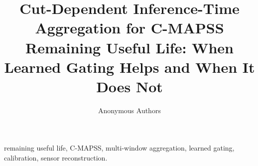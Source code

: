 \documentclass[journal]{IEEEtran}
\begin{document}
\title{Cut-Dependent Inference-Time Aggregation for C-MAPSS Remaining Useful Life:
When Learned Gating Helps and When It Does Not}

\author{Anonymous Authors}

\maketitle

\begin{abstract}

\end{abstract}

\begin{IEEEkeywords}
remaining useful life, C-MAPSS, multi-window aggregation, learned gating,
calibration, sensor reconstruction.
\end{IEEEkeywords}










\appendices




\end{document}
